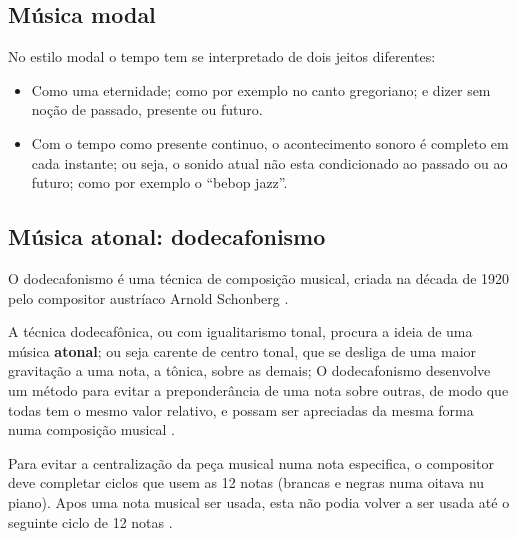 \subsection{Música modal}
\label{sec:MusicaModal}

No estilo modal o tempo tem se interpretado de dois jeitos diferentes:
\begin{itemize}
\item Como uma eternidade; como por exemplo no canto gregoriano; e dizer 
sem noção de passado, presente ou futuro.
\item Com o tempo como presente continuo, 
o acontecimento sonoro é completo em cada instante; ou seja,
 o sonido atual não esta condicionado ao passado ou ao futuro;
como por exemplo o ``bebop jazz''\cite[pp. 156]{arbones2012armonia}.
\end{itemize}



\subsection{Música atonal: dodecafonismo}
\label{sec:MusicaAtonal}
O dodecafonismo é uma técnica de composição musical, 
criada na década de 1920 pelo compositor austríaco Arnold Schonberg \cite[pp. 121]{arbones2012armonia}\cite[pp. 263]{holst1998abc}.


A técnica dodecafônica, ou com igualitarismo tonal,
procura a ideia de uma música \textbf{atonal}; ou seja carente de centro tonal,
que se desliga de uma maior gravitação a uma nota, a tônica, sobre as demais;
O dodecafonismo desenvolve um método para evitar a preponderância de uma nota sobre outras,
de modo que todas tem o mesmo valor relativo,
e possam ser apreciadas da mesma forma numa composição musical 
\cite[pp. 122]{arbones2012armonia}.

Para evitar a centralização da peça musical numa nota especifica,
o compositor deve completar ciclos que usem as 12 notas 
(brancas e negras numa oitava nu piano). 
Apos uma nota musical ser usada, 
esta não podia volver a ser usada até o seguinte ciclo de 12 notas \cite[pp. 123]{arbones2012armonia}.


